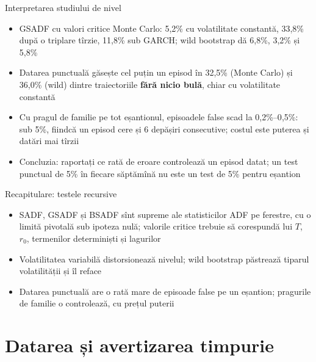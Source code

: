 \begin{frame}{Interpretarea studiului de nivel}
\itemsize{\small}
\begin{itemize}
    \item GSADF cu valori critice Monte Carlo: 5{,}2\% cu volatilitate constantă, 33{,}8\% după o triplare tîrzie, 11{,}8\% sub GARCH; wild bootstrap dă 6{,}8\%, 3{,}2\% și 5{,}8\%
    \item Datarea punctuală găsește cel puțin un episod în 32{,}5\% (Monte Carlo) și 36{,}0\% (wild) dintre traiectoriile \textbf{fără nicio bulă}, chiar cu volatilitate constantă
    \item Cu pragul de familie pe tot eșantionul, episoadele false scad la 0{,}2\%--0{,}5\%: sub 5\%, fiindcă un episod cere și 6 depășiri consecutive; costul este puterea și datări mai tîrzii
    \item Concluzia: raportați ce rată de eroare controlează un episod datat; un test punctual de 5\% în fiecare săptămînă nu este un test de 5\% pentru eșantion
\end{itemize}
\end{frame}

\begin{frame}{Recapitulare: testele recursive}
\itemsize{\small}
\begin{itemize}
    \item SADF, GSADF și BSADF sînt supreme ale statisticilor ADF pe ferestre, cu o limită pivotală sub ipoteza nulă; valorile critice trebuie să corespundă lui $T$, $r_0$, termenilor determiniști și lagurilor
    \item Volatilitatea variabilă distorsionează nivelul; wild bootstrap păstrează tiparul volatilității și îl reface
    \item Datarea punctuală are o rată mare de episoade false pe un eșantion; pragurile de familie o controlează, cu prețul puterii
\end{itemize}
\end{frame}


\section{Datarea și avertizarea timpurie}

